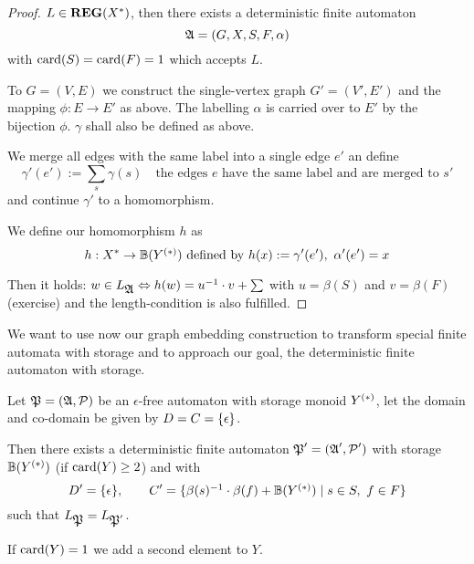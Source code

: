 \begin{proof}
$L \in \mbox{{\bf REG}}(X^*)$, then there exists a deterministic finite automaton
\[ \mbox{$\mathfrak{A}$} = (G, X, S, F, \alpha) \]
with $\mathrm{card}({S}) = \mathrm{card}({F}) = 1$ which accepts $L$.

To $G = (V, E)$ we construct the single-vertex graph $G' = (V', E')$ and the
mapping $\phi:
E \to E'$ as above. The labelling $\alpha$ is carried over to $E'$ by the
bijection $\phi$. $\gamma$ shall also be defined as above.

We merge all edges with the same label into a single edge $e'$ an define
\[ \gamma'(e') := \sum_{s} \gamma(s) \quad\text{the edges $e$ have the same
label and are merged to $s'$} \]
and continue $\gamma'$ to a homomorphism.

We define our homomorphism $h$ as
\[ h: X^* \to \mathbb{B}(\mbox{${Y}^{(*)}$})\text{ defined by }h(x) := \gamma'(e'),\
\alpha'(e') = x \]

Then it holds: $w \in L_{\mbox{$\mathfrak{A}$}} \Leftrightarrow h(w) = u^{-1} \cdot v + \sum$
with $u = \beta(S)$ and $v = \beta(F)$ (exercise) and the length-condition is
also fulfilled.
\end{proof}

\bigskip
We want to use now our graph embedding construction to transform special finite
automata with storage and to approach our goal, the deterministic finite
automaton with storage.

\begin{theorem}
Let $\mbox{$\mathfrak{P}$} = (\mbox{$\mathfrak{A}$}, \mbox{$\mathcal{P}$})$ be an $\epsilon$-free automaton with
storage monoid $\mbox{${Y}^{(*)}$}$, let the domain and co-domain be given by $D = C
= \mbox{$\{\epsilon\}$}$.

Then there exists a deterministic finite automaton $\mbox{$\mathfrak{P}$}' = (\mbox{$\mathfrak{A}$}', \mbox{$\mathcal{P}$}')$
with storage $\mathbb{B}(\mbox{${Y}^{(*)}$})$ (if $\mathrm{card}({Y}) \geq 2$) and with
\[ D' = \mbox{$\{\epsilon\}$},\qquad C' = \mbox{$\{\beta(s)^{-1} \cdot \beta(f) +
\mathbb{B}(\mbox{${Y}^{(*)}$}) \mid s\in S,\ f\in F\}$} \]
such that $L_{\mbox{$\mathfrak{P}$}} = L_{\mbox{$\mathfrak{P}$}'}$.

If $\mathrm{card}({Y}) = 1$ we add a second element to $Y$.
\end{theorem}

